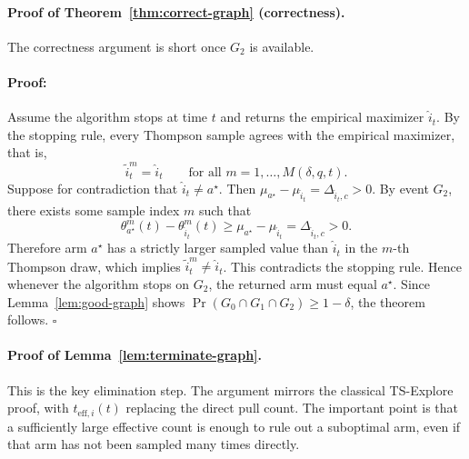 \documentclass{article}
\newenvironment{proof}{\paragraph{Proof:}}{\hfill$\square$}
\begin{document}
\paragraph{Proof of Theorem~\ref{thm:correct-graph} (correctness).}
The correctness argument is short once $G_2$ is available.

\begin{proof}
Assume the algorithm stops at time $t$ and returns the empirical maximizer $\widehat i_t$. By the stopping rule, every Thompson sample agrees with the empirical maximizer, that is,
\[
\widetilde i_t^m=\widehat i_t
\qquad\text{for all }m=1,\dots,M(\delta,q,t).
\]
Suppose for contradiction that $\widehat i_t\neq a^\star$. Then $\mu_{a^\star}-\mu_{\widehat i_t}=\Delta_{\widehat i_t,c}>0$. By event $G_2$, there exists some sample index $m$ such that
\[
\theta_{a^\star}^m(t)-\theta_{\widehat i_t}^m(t)
\ge
\mu_{a^\star}-\mu_{\widehat i_t}
=
\Delta_{\widehat i_t,c}
>
0.
\]
Therefore arm $a^\star$ has a strictly larger sampled value than $\widehat i_t$ in the $m$-th Thompson draw, which implies $\widetilde i_t^m\neq \widehat i_t$. This contradicts the stopping rule. Hence whenever the algorithm stops on $G_2$, the returned arm must equal $a^\star$. Since Lemma~\ref{lem:good-graph} shows $\Pr(G_0\cap G_1\cap G_2)\ge 1-\delta$, the theorem follows.
\end{proof}

\paragraph{Proof of Lemma~\ref{lem:terminate-graph}.}
This is the key elimination step. The argument mirrors the classical TS-Explore proof, with $t_{\mathrm{eff},i}(t)$ replacing the direct pull count. The important point is that a sufficiently large effective count is enough to rule out a suboptimal arm, even if that arm has not been sampled many times directly.
\end{document}
